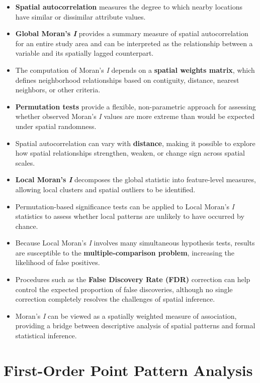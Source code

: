 \documentclass[
  letterpaper,
]{book}
\providecommand{\tightlist}{%
  \setlength{\itemsep}{0pt}\setlength{\parskip}{0pt}}
\begin{document}
\begin{itemize}
\tightlist
\item
  \textbf{Spatial autocorrelation} measures the degree to which nearby
  locations have similar or dissimilar attribute values.
\item
  \textbf{Global Moran's \emph{I}} provides a summary measure of spatial
  autocorrelation for an entire study area and can be interpreted as the
  relationship between a variable and its spatially lagged counterpart.
\item
  The computation of Moran's \emph{I} depends on a \textbf{spatial
  weights matrix}, which defines neighborhood relationships based on
  contiguity, distance, nearest neighbors, or other criteria.
\item
  \textbf{Permutation tests} provide a flexible, non-parametric approach
  for assessing whether observed Moran's \emph{I} values are more
  extreme than would be expected under spatial randomness.
\item
  Spatial autocorrelation can vary with \textbf{distance}, making it
  possible to explore how spatial relationships strengthen, weaken, or
  change sign across spatial scales.
\item
  \textbf{Local Moran's \emph{I}} decomposes the global statistic into
  feature-level measures, allowing local clusters and spatial outliers
  to be identified.
\item
  Permutation-based significance tests can be applied to Local Moran's
  \emph{I} statistics to assess whether local patterns are unlikely to
  have occurred by chance.
\item
  Because Local Moran's \emph{I} involves many simultaneous hypothesis
  tests, results are susceptible to the \textbf{multiple-comparison
  problem}, increasing the likelihood of false positives.
\item
  Procedures such as the \textbf{False Discovery Rate (FDR)} correction
  can help control the expected proportion of false discoveries,
  although no single correction completely resolves the challenges of
  spatial inference.
\item
  Moran's \emph{I} can be viewed as a spatially weighted measure of
  association, providing a bridge between descriptive analysis of
  spatial patterns and formal statistical inference.
\end{itemize}

\chapter{First-Order Point Pattern
Analysis}\label{first-order-point-pattern-analysis}
\end{document}
